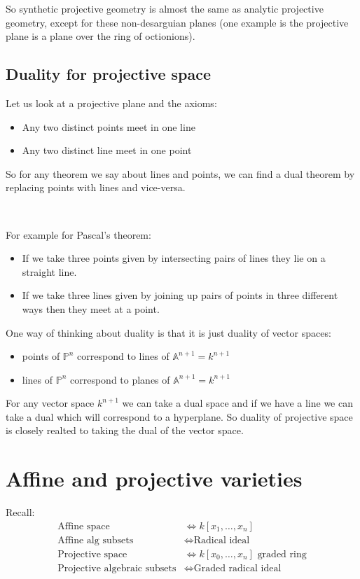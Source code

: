 So synthetic projective geometry is almost the same as analytic projective geometry, except for these non-desarguian planes (one example is the projective plane is a plane over the ring of octionions).

\subsection{Duality for projective space}

\begin{example}
    Let us look at a projective plane and the axioms:\begin{itemize}
        \item Any two distinct points meet in one line
        \item Any two distinct line meet in one point
    \end{itemize}

    So for any theorem we say about lines and points, we can find a dual theorem by replacing points with lines and vice-versa. 

    \

    For example for Pascal's theorem:\begin{itemize}
        \item If we take three points given by intersecting pairs of lines they lie on a straight line.
        \item If we take three lines given by joining up pairs of points in three different ways then they meet at a point.
    \end{itemize}
\end{example}


One way of thinking about duality is that it is just duality of vector spaces:\begin{itemize}
    \item  points of $\mathbb{P}^n$ correspond to lines of $\mathbb{A}^{n+1} = k^{n+1}$
    \item  lines of $\mathbb{P}^n$ correspond to planes of $\mathbb{A}^{n+1} = k^{n+1}$
\end{itemize}

For any vector space $k^{n+1}$ we can take a dual space and if we have a line we can take a dual which will correspond to a hyperplane. So duality of projective space is closely realted to taking the dual of the vector space.

\section{Affine and projective varieties} 
Recall:\begin{align*}
    \text{Affine space } &\iff k[x_1,\ldots,x_n]\\
    \text{Affine alg subsets} &\iff \text{Radical ideal}\\
    \text{Projective space} &\iff k[x_0,\ldots,x_n] \text{ graded ring}\\
    \text{Projective algebraic subsets} &\iff \text{Graded radical ideal}
\end{align*}

